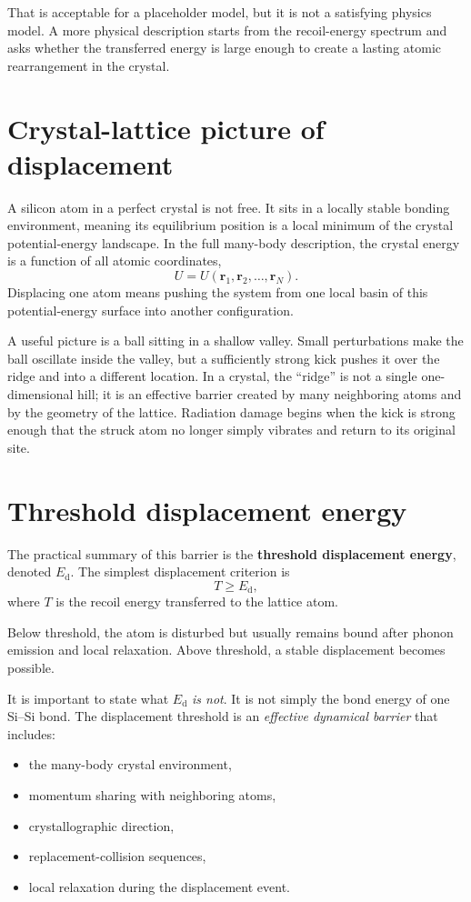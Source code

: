 \documentclass[11pt]{article}
\newcommand{\Ed}{E_{\mathrm d}}
\begin{document}
That is acceptable for a placeholder model, but it is not a satisfying physics model. A more physical description starts from the recoil-energy spectrum and asks whether the transferred energy is large enough to create a lasting atomic rearrangement in the crystal.

\section{Crystal-lattice picture of displacement}

A silicon atom in a perfect crystal is not free. It sits in a locally stable bonding environment, meaning its equilibrium position is a local minimum of the crystal potential-energy landscape. In the full many-body description, the crystal energy is a function of all atomic coordinates,
\begin{equation}
U = U(\mathbf r_1, \mathbf r_2, \dots, \mathbf r_N).
\end{equation}
Displacing one atom means pushing the system from one local basin of this potential-energy surface into another configuration.

A useful picture is a ball sitting in a shallow valley. Small perturbations make the ball oscillate inside the valley, but a sufficiently strong kick pushes it over the ridge and into a different location. In a crystal, the ``ridge'' is not a single one-dimensional hill; it is an effective barrier created by many neighboring atoms and by the geometry of the lattice. Radiation damage begins when the kick is strong enough that the struck atom no longer simply vibrates and return to its original site.

\section{Threshold displacement energy}

The practical summary of this barrier is the \textbf{threshold displacement energy}, denoted $\Ed$. The simplest displacement criterion is
\begin{equation}
T \ge \Ed,
\end{equation}
where $T$ is the recoil energy transferred to the lattice atom.

Below threshold, the atom is disturbed but usually remains bound after phonon emission and local relaxation. Above threshold, a stable displacement becomes possible.

It is important to state what $\Ed$ \emph{is not}. It is not simply the bond energy of one Si--Si bond. The displacement threshold is an \emph{effective dynamical barrier} that includes:
\begin{itemize}
    \item the many-body crystal environment,
    \item momentum sharing with neighboring atoms,
    \item crystallographic direction,
    \item replacement-collision sequences,
    \item local relaxation during the displacement event.
\end{itemize}
\end{document}
